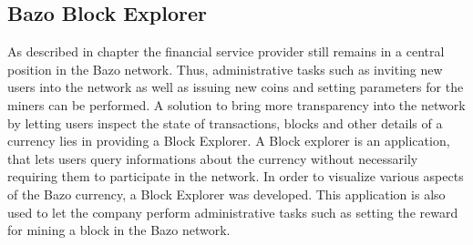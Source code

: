 \subsection{Bazo Block Explorer}
As described in chapter \cite{undefined} the financial service provider still remains in a central position in the Bazo network. Thus, administrative tasks such as inviting new users into the network as well as issuing new coins and setting
parameters for the miners can be performed.
A solution to bring more transparency into the network by letting users inspect the state of transactions, blocks and other details of a currency lies in providing a Block Explorer. A Block explorer is an application, that lets users query informations about the currency without necessarily requiring them to participate in the network.
In order to visualize various aspects of the Bazo currency, a Block Explorer was developed. This application is also used to let the company perform administrative tasks such as setting the reward for mining a block in the Bazo network.